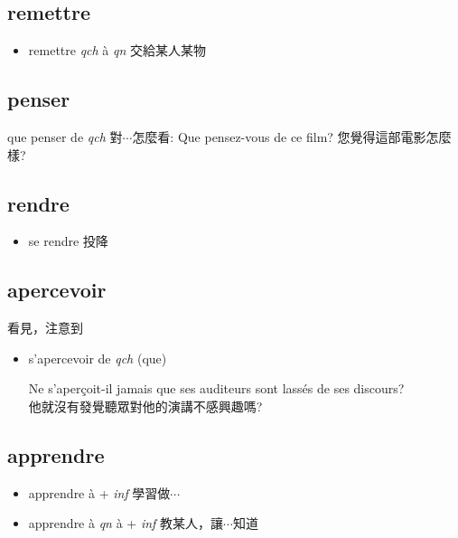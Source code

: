 \documentclass{book}
\begin{document}
        \subsection{remettre}
            \begin{itemize}
                \item remettre \textit{qch} à \textit{qn} 交給某人某物
            \end{itemize}

        \subsection{penser}
            que penser de \textit{qch} 對$\cdots$怎麼看: Que pensez-vous de ce film? 您覺得這部電影怎麼樣?
        
        \subsection{rendre}
            \begin{itemize}
                \item se rendre 投降
            \end{itemize}

        \subsection{apercevoir}
            看見，注意到
            \begin{itemize}
                \item s'apercevoir de \textit{qch} (que)
                    \begin{center}
                        Ne s'aperçoit-il jamais que ses auditeurs sont lassés de ses discours? \\
                        他就沒有發覺聽眾對他的演講不感興趣嗎?
                    \end{center}
            \end{itemize}

        \subsection{apprendre}
            \begin{itemize}
                \item apprendre à + \textit{inf} 學習做$\cdots$
                \item apprendre à \textit{qn} à + \textit{inf} 教某人，讓$\cdots$知道
            \end{itemize}
\end{document}
